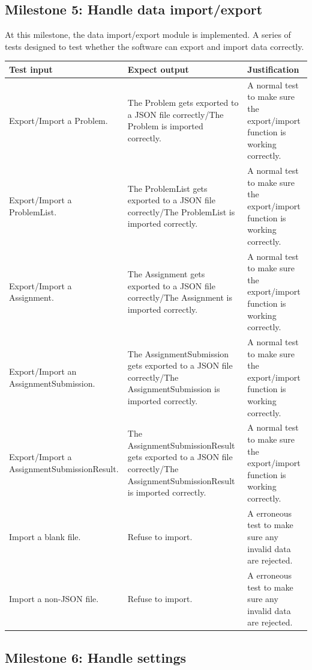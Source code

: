 \documentclass[a4paper]{report}
\begin{document}
\subsection{Milestone 5: Handle data import/export}

At this milestone, the data import/export module is implemented. A series of tests designed to test whether the software can export and import data correctly.

\begin{tabulary}{\textwidth}{|L|L|L|}
    \hline
    Test input & Expect output & Justification \\
    \hline
    Export/Import a Problem. & The Problem gets exported to a JSON file correctly/The Problem is imported correctly. & A normal test to make sure the export/import function is working correctly. \\
    \hline
    Export/Import a ProblemList. & The ProblemList gets exported to a JSON file correctly/The ProblemList is imported correctly. & A normal test to make sure the export/import function is working correctly. \\
    \hline
    Export/Import a Assignment. & The Assignment gets exported to a JSON file correctly/The Assignment is imported correctly. & A normal test to make sure the export/import function is working correctly. \\
    \hline
    Export/Import an AssignmentSubmission. & The AssignmentSubmission gets exported to a JSON file correctly/The AssignmentSubmission is imported correctly. & A normal test to make sure the export/import function is working correctly. \\
    \hline
    Export/Import a AssignmentSubmissionResult. & The AssignmentSubmissionResult gets exported to a JSON file correctly/The AssignmentSubmissionResult is imported correctly. & A normal test to make sure the export/import function is working correctly. \\
    \hline
    Import a blank file. & Refuse to import. & A erroneous test to make sure any invalid data are rejected. \\
    \hline
    Import a non-JSON file. & Refuse to import. & A erroneous test to make sure any invalid data are rejected. \\
    \hline
\end{tabulary}

\subsection{Milestone 6: Handle settings}
\end{document}
